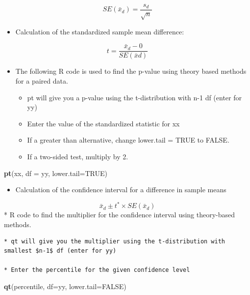\documentclass[
]{report}
\newenvironment{Shaded}{\begin{snugshade}}{\end{snugshade}}
\newcommand{\AttributeTok}[1]{\textcolor[rgb]{0.13,0.29,0.53}{#1}}
\newcommand{\ConstantTok}[1]{\textcolor[rgb]{0.56,0.35,0.01}{#1}}
\newcommand{\FunctionTok}[1]{\textcolor[rgb]{0.13,0.29,0.53}{\textbf{#1}}}
\newcommand{\NormalTok}[1]{#1}
\providecommand{\tightlist}{%
  \setlength{\itemsep}{0pt}\setlength{\parskip}{0pt}}
\begin{document}
\[SE(\bar{x}_d) = \frac{s_d}{\sqrt{n}}\]

\begin{itemize}
\tightlist
\item
  Calculation of the standardized sample mean difference:
\end{itemize}

\[t = \frac{\bar{x}_d-0}{SE(\bar{x}d)}\]

\begin{itemize}
\item
  The following R code is used to find the p-value using theory based methods for a paired data.

  \begin{itemize}
  \item
    pt will give you a p-value using the t-distribution with n-1 df (enter for yy)
  \item
    Enter the value of the standardized statistic for xx
  \item
    If a greater than alternative, change lower.tail = TRUE to FALSE.
  \item
    If a two-sided test, multiply by 2.
  \end{itemize}
\end{itemize}

\begin{Shaded}
\begin{Highlighting}[]
\FunctionTok{pt}\NormalTok{(xx, }\AttributeTok{df =}\NormalTok{ yy, }\AttributeTok{lower.tail=}\ConstantTok{TRUE}\NormalTok{)}
\end{Highlighting}
\end{Shaded}

\begin{itemize}
\tightlist
\item
  Calculation of the confidence interval for a difference in sample means
\end{itemize}

\[\bar{x}_d\pm t^*\times SE(\bar{x}_d)\]
* R code to find the multiplier for the confidence interval using theory-based methods.

\begin{verbatim}
* qt will give you the multiplier using the t-distribution with smallest $n-1$ df (enter for yy)

* Enter the percentile for the given confidence level
\end{verbatim}

\begin{Shaded}
\begin{Highlighting}[]
\FunctionTok{qt}\NormalTok{(percentile, }\AttributeTok{df=}\NormalTok{yy, }\AttributeTok{lower.tail=}\ConstantTok{FALSE}\NormalTok{)}
\end{Highlighting}
\end{Shaded}
\end{document}
